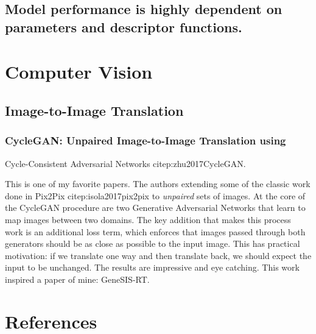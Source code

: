 \documentclass[12pt]{article}
\begin{document}
\subsection{Model performance is highly dependent on parameters and descriptor functions.}
\label{sec:orge48080c}



\section{Computer Vision}
\label{sec:org24bdf33}
\subsection{Image-to-Image Translation}
\label{sec:org900a111}
\subsubsection{CycleGAN: Unpaired Image-to-Image Translation using}
\label{sec:org8a0a19b}
Cycle-Consistent Adversarial Networks citep:zhu2017CycleGAN.



This is one of my favorite papers. The authors extending some
of the classic work done in Pix2Pix citep:isola2017pix2pix to
\emph{unpaired} sets of images. At the core of the CycleGAN
procedure are two Generative Adversarial Networks that learn
to map images between two domains. The key addition that makes
this process work is an additional loss term, which enforces
that images passed through both generators should be as close
as possible to the input image. This has practical motivation:
if we translate one way and then translate back, we should
expect the input to be unchanged. The results are impressive
and eye catching. This work inspired a paper of mine:
GeneSIS-RT.

\section*{References}
\label{sec:orgc73ae68}
\printbibliography[heading=none]
\end{document}
